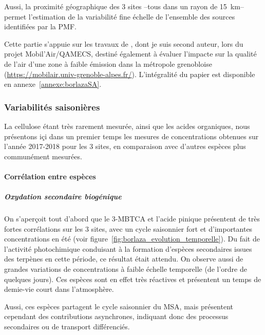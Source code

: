 Aussi, la proximité géographique des 3 sites --tous dans un rayon de \SI{15}{\kilo\m}--
permet l'estimation de la variabilité fine échelle de l'ensemble des sources identifiées
par la PMF.

\begin{tcolorbox}[colback=red!5!white,colframe=Melon,title=Note]
    Cette partie s'appuie sur les travaux de \cite{borlazaFinescaleinprep.}, dont je suis
    second auteur, lors du projet Mobil'Air/QAMECS, destiné également à évaluer l'impacte
    sur la qualité de l'air d'une zone à faible émission dans la métropole grenobloise 
    (\url{https://mobilair.univ-grenoble-alpes.fr/}).
    L'intégralité du papier est disponible en annexe~\ref{annexe:borlazaSA}.
\end{tcolorbox}

\subsubsection{Variabilités saisonières}%
\label{ssub:variabilites_saisonières}

La cellulose étant très rarement mesurée, ainsi que les acides organiques, nous
présentons içi dans un premier temps les mesures de concentrations obtenues sur l'année
2017-2018 pour les 3 sites, en comparaison avec d'autres espèces plus communément
mesurées.

\paragraph{Corrélation entre espèces}%
\label{par:correlation_entre_especes}

\subparagraph{Oxydation secondaire biogénique}%
\label{par:oxydation_secondaire_biogénique}

On s'aperçoit tout d'abord que le 3-MBTCA et l'acide pinique présentent de très fortes
corrélations sur les 3 sites, avec un cycle saisonnier fort et d'importantes concentrations
en été (voir figure~\ref{fig:borlaza_evolution_temporelle}). Du fait de l'activité
photochimique conduisant à la formation d'espèces secondaires issues des terpènes en
cette période, ce résultat était attendu. On observe aussi de grandes variations de
concentrations à faible échelle temporelle (de l'ordre de quelques jours). Ces espèces
sont en effet très réactives et présentent un temps de demie-vie court dans l'atmosphère.

Aussi, ces espèces partagent le cycle saisonnier du MSA, mais présentent cependant des
contributions asynchrones, indiquant donc des processus secondaires ou de transport
différenciés.

